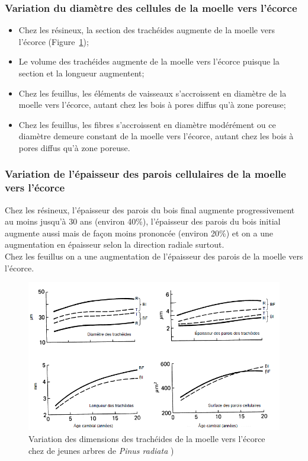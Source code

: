 \subsubsection{Variation du diamètre des cellules de la moelle vers l'écorce}

\begin{itemize}
	\item Chez les résineux, la section des trachéides augmente de la moelle vers l'écorce (Figure~\ref{fig:resume_resineux});
	\item Le volume des trachéides augmente de la moelle vers l'écorce puisque la section et la longueur augmentent;
	\item Chez les feuillus, les éléments de vaisseaux s'accroissent en diamètre de la moelle vers l'écorce, autant chez les bois à pores diffus qu'à zone poreuse; 
	\item Chez les feuillus, les fibres s'accroissent en diamètre modérément ou ce diamètre demeure constant de la moelle vers l'écorce, autant chez les bois à pores diffus qu'à zone poreuse.
\end{itemize}

\subsubsection{Variation de l'épaisseur des parois cellulaires de la moelle vers l'écorce}

Chez les résineux, l'épaisseur des parois du bois final augmente progressivement au moins jusqu'à 30 ans (environ 40\%), l'épaisseur des parois du bois initial augmente aussi mais de façon moins prononcée (environ 20\%) et on a une augmentation en épaisseur selon la direction radiale surtout.\\

Chez les feuillus on a une augmentation de l'épaisseur des parois de la moelle vers l'écorce.

\begin{figure}[h]
	\centering
	\includegraphics[scale=0.7]{img/ch7_resume_resineux}
	\caption{Variation des dimensions des trachéides de la moelle vers l'écorce chez de jeunes arbres de \textit{Pinus radiata} \cite{panshin1980textbook})}
	\label{fig:resume_resineux}
\end{figure}


